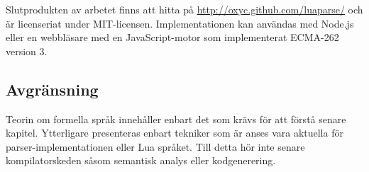 Slutprodukten av arbetet finns att hitta på
\url{http://oxyc.github.com/luaparse/} och är licenseriat under MIT-licensen.
Implementationen kan användas med Node.js eller en webbläsare med en
JavaScript-motor som implementerat ECMA-262 version 3.

\subsection{Avgränsning}

Teorin om formella språk innehåller enbart det som krävs för att förstå senare
kapitel. Ytterligare presenteras enbart tekniker som är anses vara aktuella
för parser-implementationen eller Lua språket. Till detta hör inte senare
kompilatorskeden såsom semantisk analys eller kodgenerering.

